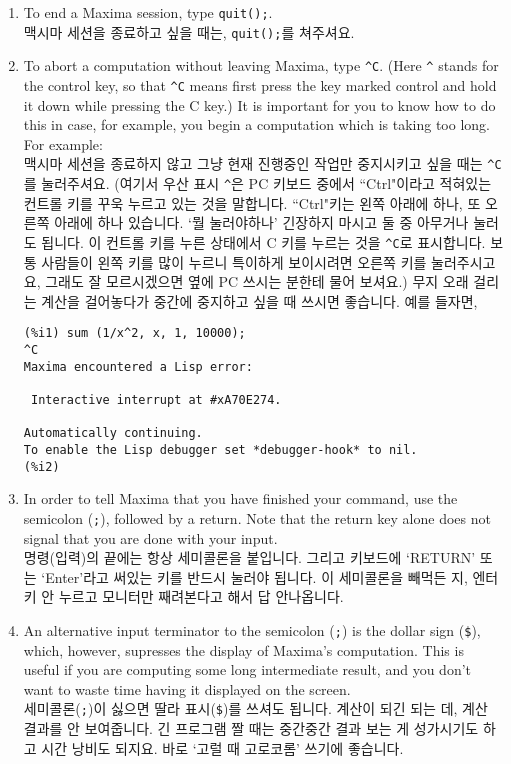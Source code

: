 \documentclass[a4paper,12pt]{article}
\begin{document}
\begin{enumerate}
\item To end a Maxima session, type {\tt quit();}. \\
          맥시마 세션을 종료하고 싶을 때는, {\tt quit();}를 쳐주셔요.

\item To abort a computation without leaving Maxima, type \verb+^C+.
(Here \verb+^+ stands for the control key, so
that \verb+^C+ means first press the key marked control and hold it down while pressing the C key.)
It is important for you to
know how to do this in case, for example, you begin a computation which is taking too long.
For example: \\
맥시마 세션을 종료하지 않고 그냥 현재 진행중인 작업만 중지시키고 싶을 때는 \verb+^C+를 눌러주셔요. 
(여기서 우산 표시 \verb+^+은 PC 키보드 중에서 ``Ctrl"이라고 적혀있는 컨트롤 키를 꾸욱 누르고 있는 
것을 말합니다. ``Ctrl"키는 왼쪽 아래에 하나, 또 오른쪽 아래에 하나 있습니다. `뭘 눌러야하나' 긴장하지 
마시고 둘 중 아무거나 눌러도 됩니다. 
이 컨트롤 키를 누른 상태에서 C 키를 누르는 것을 \verb+^C+로 표시합니다. 보통 사람들이 왼쪽 키를 많이 누르니
특이하게 보이시려면 오른쪽 키를 눌러주시고요, 그래도 잘 모르시겠으면 옆에 PC 쓰시는 분한테 물어 보셔요.)
무지 오래 걸리는 계산을 걸어놓다가 중간에 중지하고 싶을 때 쓰시면 좋습니다. 예를 들자면,

\begin{verbatim}
(%i1) sum (1/x^2, x, 1, 10000);
^C
Maxima encountered a Lisp error:

 Interactive interrupt at #xA70E274.

Automatically continuing.
To enable the Lisp debugger set *debugger-hook* to nil.
(%i2) 
\end{verbatim}

\item In order to tell Maxima that you have finished your command, use 
  the semicolon ({\tt ;}), followed by a return.  Note that the return 
  key alone does not signal that you are done with your input. \\
명령(입력)의 끝에는 항상 세미콜론을 붙입니다. 그리고 키보드에 `RETURN' 
또는 `Enter'라고 써있는 키를 반드시 눌러야 됩니다. 이 세미콜론을 빼먹든 
지, 엔터키 안 누르고 모니터만 째려본다고 해서  답 안나옵니다. 

\item An alternative input terminator to the semicolon ({\tt ;}) is 
  the dollar sign ({\tt \$}), which, however, supresses the display of 
  Maxima's computation.  This is useful if you are computing some long 
  intermediate result, and you don't want to waste time having it 
  displayed on the screen. \\
세미콜론({\tt ;})이 싫으면 딸라 표시({\tt \$})를 쓰셔도 됩니다. 계산이 되긴 
되는 데, 계산 결과를 안 보여줍니다. 긴 프로그램 짤 때는 중간중간 결과 보는 
게 성가시기도 하고 시간 낭비도 되지요. 바로 `고럴 때 고로코롬' 쓰기에 좋습니다. 


\end{enumerate}
\end{document}
